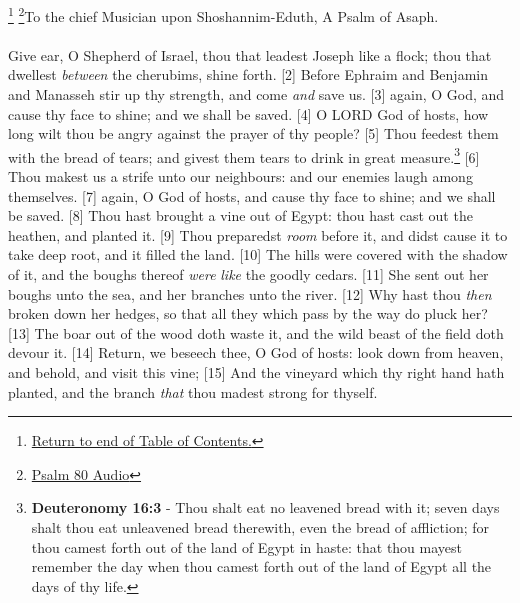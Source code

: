\footnote{\textcolor[rgb]{0.00,0.25,0.00}{\hyperlink{TOC}{Return to end of Table of Contents.}}}
\footnote{\href{https://audiobible.com/bible/psalms_80.html}{\textcolor[cmyk]{0.99998,1,0,0}{Psalm 80 Audio}}}\textcolor[cmyk]{0.99998,1,0,0}{To the chief Musician upon Shoshannim-Eduth, A Psalm of Asaph.}\\
\\
\textcolor[cmyk]{0.99998,1,0,0}{Give ear, O Shepherd of Israel, thou that leadest Joseph like a flock; thou that dwellest \emph{between} the cherubims, shine forth.}
[2] \textcolor[cmyk]{0.99998,1,0,0}{Before Ephraim and Benjamin and Manasseh stir up thy strength, and come \emph{and} save us.}
[3] \textcolor[cmyk]{0.99998,1,0,0}{ again, O God, and cause thy face to shine; and we shall be saved.}
[4] \textcolor[cmyk]{0.99998,1,0,0}{O LORD God of hosts, how long wilt thou be angry against the prayer of thy people?}
[5] \textcolor[cmyk]{0.99998,1,0,0}{Thou feedest them with the bread of tears; and givest them tears to drink in great measure.}\footnote{\textbf{Deuteronomy 16:3} - Thou shalt eat no leavened bread with it; seven days shalt thou eat unleavened bread therewith, even the bread of affliction; for thou camest forth out of the land of Egypt in haste: that thou mayest remember the day when thou camest forth out of the land of Egypt all the days of thy life.}
[6] \textcolor[cmyk]{0.99998,1,0,0}{Thou makest us a strife unto our neighbours: and our enemies laugh among themselves.}
[7] \textcolor[cmyk]{0.99998,1,0,0}{ again, O God of hosts, and cause thy face to shine; and we shall be saved.}
[8] \textcolor[cmyk]{0.99998,1,0,0}{Thou hast brought a vine out of Egypt: thou hast cast out the heathen, and planted it.}
[9] \textcolor[cmyk]{0.99998,1,0,0}{Thou preparedst \emph{room} before it, and didst cause it to take deep root, and it filled the land.}
[10] \textcolor[cmyk]{0.99998,1,0,0}{The hills were covered with the shadow of it, and the boughs thereof \emph{were} \emph{like} the goodly cedars.}
[11] \textcolor[cmyk]{0.99998,1,0,0}{She sent out her boughs unto the sea, and her branches unto the river.}
[12] \textcolor[cmyk]{0.99998,1,0,0}{Why hast thou \emph{then} broken down her hedges, so that all they which pass by the way do pluck her?}
[13] \textcolor[cmyk]{0.99998,1,0,0}{The boar out of the wood doth waste it, and the wild beast of the field doth devour it.}
[14] \textcolor[cmyk]{0.99998,1,0,0}{Return, we beseech thee, O God of hosts: look down from heaven, and behold, and visit this vine;}
[15] \textcolor[cmyk]{0.99998,1,0,0}{And the vineyard which thy right hand hath planted, and the branch \emph{that} thou madest strong for thyself.}
